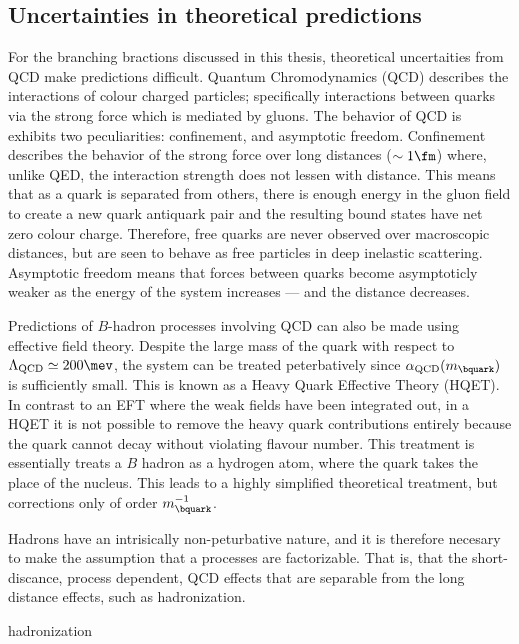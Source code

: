 \subsection{Uncertainties in theoretical predictions}
\cite{Pich:1998xt}

For the branching bractions discussed in this thesis, theoretical uncertaities from QCD make
predictions difficult.
Quantum Chromodynamics (QCD) describes the interactions of colour charged particles; specifically
interactions between quarks via the strong force which is mediated by gluons.
The behavior of QCD is exhibits two peculiarities: confinement, and asymptotic freedom.
Confinement describes the behavior of the strong force over long distances ($\sim1\fm$)
where, unlike QED, the interaction strength does not lessen with distance.
This means that as a quark is separated from others, there is enough energy in the gluon field to
create a new quark antiquark pair and the resulting bound states have net zero colour charge.
Therefore, free quarks are never observed over macroscopic distances, but are seen to behave as free
particles in deep inelastic scattering.
Asymptotic freedom means that forces between quarks become asymptoticly weaker as the energy of
the system increases --- and the distance decreases.

Predictions of $B$-hadron processes involving QCD can also be made using effective field theory.
Despite the large mass of the \bquark quark with respect to $\Lambda_\mathrm{QCD}\simeq200\mev$,
the system can be treated peterbatively since $\alpha_\mathrm{QCD}(m_\bquark)$ is sufficiently
small.
This is known as a Heavy Quark Effective Theory (HQET).
In contrast to an EFT where the weak fields have been integrated out, in a HQET
it is not possible to remove the heavy quark contributions entirely because the \bquark quark
cannot decay without violating flavour number.
This treatment is essentially treats a $B$ hadron as a hydrogen atom, where the \bquark quark takes
the place of the nucleus.
This leads to a highly simplified theoretical treatment, but corrections only of order
$m_\bquark^{-1}$.

Hadrons have an intrisically non-peturbative nature, and it is therefore necesary to make the
assumption that a processes are factorizable.
That is, that the short-discance, process dependent, QCD effects that are separable from the long
distance effects, such as hadronization.


hadronization



